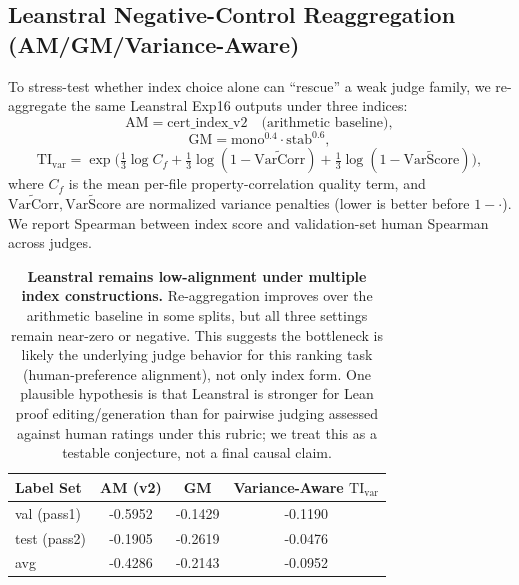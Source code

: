 \documentclass{article}
\begin{document}
\subsection{Leanstral Negative-Control Reaggregation (AM/GM/Variance-Aware)}
To stress-test whether index choice alone can ``rescue'' a weak judge family, we re-aggregate the same Leanstral Exp16 outputs under three indices:
\[
  \mathrm{AM}=\text{cert\_index\_v2} \quad \text{(arithmetic baseline)},
\]
\[
  \mathrm{GM}=\mathrm{mono}^{0.4}\cdot \mathrm{stab}^{0.6},
\]
\[
  \mathrm{TI}_{\mathrm{var}}=\exp\!\Big(\tfrac{1}{3}\log C_f+\tfrac{1}{3}\log(1-\widetilde{\mathrm{VarCorr}})+\tfrac{1}{3}\log(1-\widetilde{\mathrm{VarScore}})\Big),
\]
where \(C_f\) is the mean per-file property-correlation quality term, and \(\widetilde{\mathrm{VarCorr}},\widetilde{\mathrm{VarScore}}\) are normalized variance penalties (lower is better before \(1-\cdot\)).
We report Spearman between index score and validation-set human Spearman across judges.

\begin{table}[t]
  \centering
  \small
  \begin{tabular}{lccc}
    \toprule
    \textbf{Label Set} & \textbf{AM (v2)} & \textbf{GM} & \textbf{Variance-Aware \(\mathrm{TI}_{\mathrm{var}}\)} \\
    \midrule
    val (pass1)        & -0.5952          & -0.1429     & -0.1190                                                \\
    test (pass2)       & -0.1905          & -0.2619     & -0.0476                                                \\
    avg                & -0.4286          & -0.2143     & -0.0952                                                \\
    \bottomrule
  \end{tabular}
  \caption{\textbf{Leanstral remains low-alignment under multiple index constructions.}
    Re-aggregation improves over the arithmetic baseline in some splits, but all three settings remain near-zero or negative.
    This suggests the bottleneck is likely the underlying judge behavior for this ranking task (human-preference alignment), not only index form.
    One plausible hypothesis is that Leanstral is stronger for Lean proof editing/generation than for pairwise judging assessed against human ratings under this rubric; we treat this as a testable conjecture, not a final causal claim.}
  \label{tab:app-leanstral-index-reagg}
\end{table}
\end{document}
